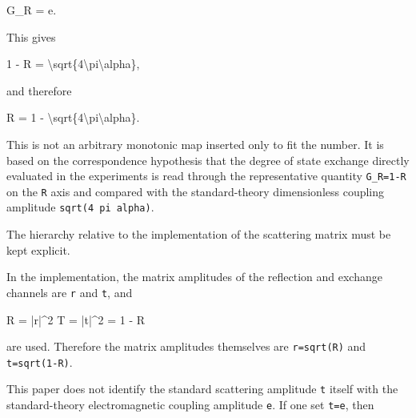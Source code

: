 \documentclass[
]{article}
\newenvironment{Shaded}{}{}
\newcommand{\NormalTok}[1]{#1}
\begin{document}
\begin{Shaded}
\begin{Highlighting}[]
\NormalTok{G\_R = e.}
\end{Highlighting}
\end{Shaded}

This gives

\begin{Shaded}
\begin{Highlighting}[]
\NormalTok{1 {-} R = \textbackslash{}sqrt\{4\textbackslash{}pi\textbackslash{}alpha\},}
\end{Highlighting}
\end{Shaded}

and therefore

\begin{Shaded}
\begin{Highlighting}[]
\NormalTok{R = 1 {-} \textbackslash{}sqrt\{4\textbackslash{}pi\textbackslash{}alpha\}.}
\end{Highlighting}
\end{Shaded}

This is not an arbitrary monotonic map inserted only to fit the number.
It is based on the correspondence hypothesis that the degree of state
exchange directly evaluated in the experiments is read through the
representative quantity \texttt{G\_R=1-R} on the \texttt{R} axis and
compared with the standard-theory dimensionless coupling amplitude
\texttt{sqrt(4\ pi\ alpha)}.

The hierarchy relative to the implementation of the scattering matrix
must be kept explicit.

In the implementation, the matrix amplitudes of the reflection and
exchange channels are \texttt{r} and \texttt{t}, and

\begin{Shaded}
\begin{Highlighting}[]
\NormalTok{R = |r|\^{}2}
\NormalTok{T = |t|\^{}2 = 1 {-} R}
\end{Highlighting}
\end{Shaded}

are used. Therefore the matrix amplitudes themselves are
\texttt{\textbar{}r\textbar{}=sqrt(R)} and
\texttt{\textbar{}t\textbar{}=sqrt(1-R)}.

This paper does not identify the standard scattering amplitude
\texttt{\textbar{}t\textbar{}} itself with the standard-theory
electromagnetic coupling amplitude \texttt{e}. If one set
\texttt{\textbar{}t\textbar{}=e}, then
\end{document}

